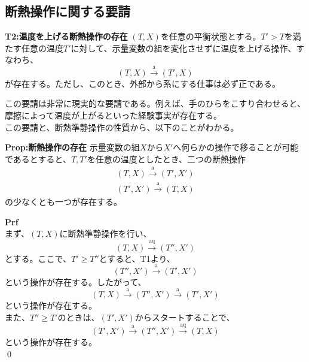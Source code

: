 \documentclass[a4paper,11pt]{jsarticle}
\numberwithin{equation}{section}
\begin{document}
\subsection{断熱操作に関する要請}
\begin{itembox}[l]{\textbf{T2:温度を上げる断熱操作の存在}}
    $(T,X)$を任意の平衡状態とする。$T'>T$を満たす任意の温度$T'$に対して、示量変数の組を変化させずに温度を上げる操作、すなわち、
    \begin{equation}
        (T,X) \xrightarrow{\text{a}} (T',X)
    \end{equation}
    が存在する。ただし、このとき、外部から系にする仕事は必ず正である。
\end{itembox}
この要請は非常に現実的な要請である。例えば、手のひらをこすり合わせると、摩擦によって温度が上がるといった経験事実が存在する。\\
この要請と、断熱準静操作の性質から、以下のことがわかる。\\
\begin{itembox}[l]{\textbf{Prop:断熱操作の存在}}
    示量変数の組$X$から$X'$へ何らかの操作で移ることが可能であるとすると、$T,T'$を任意の温度としたとき、二つの断熱操作
    \begin{align}
        (T,X) \xrightarrow{\text{a}} (T',X')\\
        (T',X') \xrightarrow{\text{a}} (T,X)
    \end{align}
    の少なくとも一つが存在する。
\end{itembox}
\textbf{Prf}\\
まず、$(T,X)$に断熱準静操作を行い、
\begin{equation}
    (T,X) \xrightarrow{\text{aq}} (T'',X')
\end{equation}
とする。ここで、$T'\geq T''$とすると、T1より、
\begin{equation}
    (T'',X') \xrightarrow{\text{a}} (T',X')
\end{equation}
という操作が存在する。したがって、
\begin{equation}
    (T,X) \xrightarrow{\text{a}} (T'',X') \xrightarrow{\text{a}} (T',X')
\end{equation}
という操作が存在する。\\
また、$T''\geq T'$のときは、$(T',X') $からスタートすることで、
\begin{equation}
    (T',X') \xrightarrow{\text{a}} (T'',X') \xrightarrow{\text{aq}} (T,X)
\end{equation}
という操作が存在する。\\
\qed\\
\end{document}
